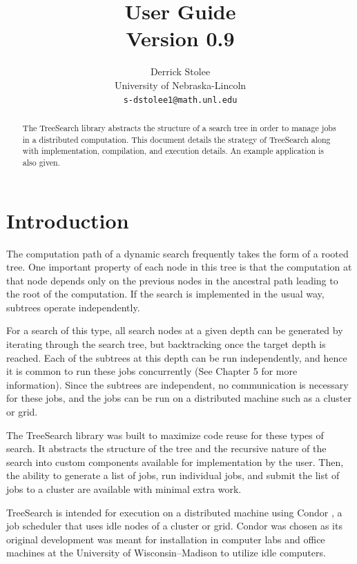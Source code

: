 \documentclass[11pt]{article}
\title{{\TreeSearch} User Guide\\ {\large Version 0.9}}
\author{Derrick Stolee \\ 
	University of Nebraska-Lincoln\\ 
	\texttt{s-dstolee1@math.unl.edu}
       }
\def\TreeSearch{{TreeSearch}}
\begin{document}
\maketitle
\vspace{-.3in}
\begin{abstract}
	The {\TreeSearch} library abstracts the structure of a search tree
		in order to manage jobs in a distributed computation.
	This document details the strategy of {\TreeSearch} along with
		implementation, compilation, and execution details.
	An example application is also given.
\end{abstract}

\section{Introduction}
\label{sec:Introduction}

The computation path of a dynamic search frequently takes the form of a rooted tree.
One important property of each node in this tree is that the computation at that
	node depends only on the previous nodes in the ancestral path leading
	to the root of the computation.
If the search is implemented in the usual way, subtrees operate independently.

For a search of this type, all search nodes at a given depth 
	can be generated by iterating through the search tree, but 
	backtracking once the target depth is reached.
Each of the subtrees at this depth can be run independently,
	and hence it is common to run these jobs concurrently 
	(See \cite{ClassificationAlgorithms} Chapter 5 for more information).
Since the subtrees are independent, no communication is necessary for 
	these jobs, and the jobs can be run on a distributed machine 
	such as a cluster or grid.

The {\TreeSearch} library was built to maximize code reuse for these types of search.
It abstracts the structure of the tree and the recursive nature of the search into
	custom components available for implementation by the user.
Then, the ability to generate a list of jobs, run individual jobs, and submit the list
	of jobs to a cluster are available with minimal extra work.
	
{\TreeSearch} is intended for execution 
	on a distributed machine using
	Condor \cite{condor-practice},
	a job scheduler that uses idle nodes of a cluster or grid.
Condor was chosen as its original development was meant for
	installation in computer labs and office machines 
	at the University of Wisconsin--Madison
	to utilize idle computers.
	
\end{document}
